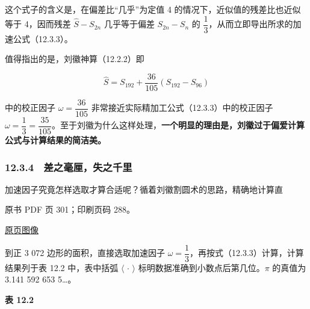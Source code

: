 这个式子的含义是，在偏差比``几乎''为定值 4 的情况下，近似值的残差比也近似等于 4，因而残差 \(\widehat S-S_{2n}\) 几乎等于偏差 \(S_{2n}-S_n\) 的 \(\dfrac13\)，从而立即导出所求的加速公式（12.3.3）。

值得指出的是，刘徽神算（12.2.2）即

\[
\widehat S=S_{192}+\frac{36}{105}(S_{192}-S_{96})
\]

中的校正因子 \(\omega=\dfrac{36}{105}\) 非常接近实际精加工公式（12.3.3）中的校正因子 \(\omega=\dfrac13=\dfrac{35}{105}\)。至于刘徽为什么这样处理，\textbf{一个明显的理由是，刘徽过于偏爱计算公式与计算结果的简洁美。}

\subsubsection{12.3.4　差之毫厘，失之千里}\label{ch12-ux5deeux4e4bux6bebux5398ux5931ux4e4bux5343ux91cc}

加速因子究竟怎样选取才算合适呢？循着刘徽割圆术的思路，精确地计算直

\clearpage

原书 PDF 页 301；印刷页码 288。

\href{source-images/pdf-301.jpeg}{原页图像}

到正 3 072 边形的面积，直接选取加速因子 \(\omega=\dfrac13\)，再按式（12.3.3）计算，计算结果列于表 12.2 中，表中括弧 \(\langle\,\cdot\,\rangle\) 标明数据准确到小数点后第几位。\(\pi\) 的真值为 3.141 592 653 5\ldots。

\textbf{表 12.2}

